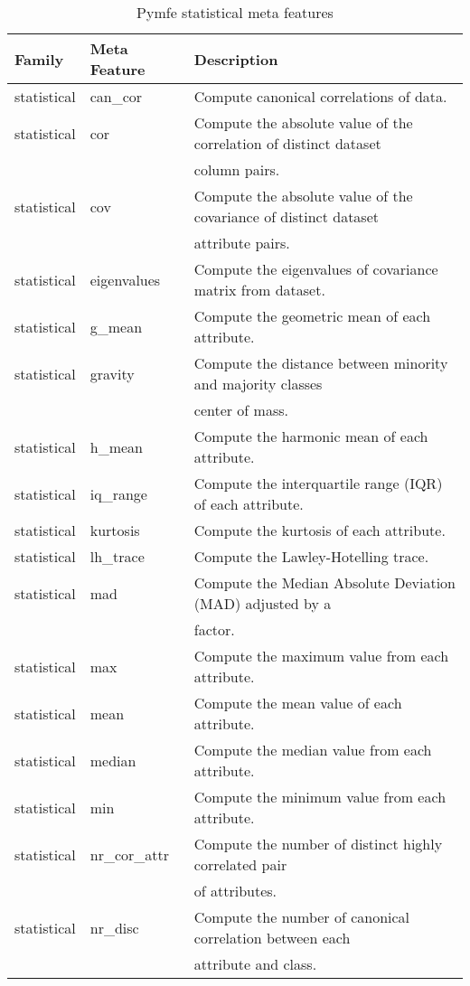 \begin{table}[h!]
  \centering
  \caption{Pymfe statistical meta features}
  \setlength{\tabcolsep}{8pt}
  \renewcommand{\arraystretch}{1.2}
  \begin{tabular}{lll}
    \hline
    Family & Meta Feature & Description \\ \hline
    statistical & can\_cor & Compute canonical correlations of data.\\
    statistical & cor & Compute the absolute value of the correlation of distinct dataset\\ & & column pairs.\\
    statistical & cov & Compute the absolute value of the covariance of distinct dataset\\ & & attribute pairs.\\
    statistical & eigenvalues & Compute the eigenvalues of covariance matrix from dataset.\\
    statistical & g\_mean & Compute the geometric mean of each attribute.\\
    statistical & gravity & Compute the distance between minority and majority classes\\ & & center of mass.\\
    statistical & h\_mean & Compute the harmonic mean of each attribute.\\
    statistical & iq\_range & Compute the interquartile range (IQR) of each attribute.\\
    statistical & kurtosis & Compute the kurtosis of each attribute.\\
    statistical & lh\_trace & Compute the Lawley-Hotelling trace.\\
    statistical & mad & Compute the Median Absolute Deviation (MAD) adjusted by a\\ & & factor.\\
    statistical & max & Compute the maximum value from each attribute.\\
    statistical & mean & Compute the mean value of each attribute.\\
    statistical & median & Compute the median value from each attribute.\\
    statistical & min & Compute the minimum value from each attribute.\\
    statistical & nr\_cor\_attr & Compute the number of distinct highly correlated pair\\ & & of attributes.\\
    statistical & nr\_disc & Compute the number of canonical correlation between each\\ & & attribute and class.\\

\end{tabular}
\end{table}
